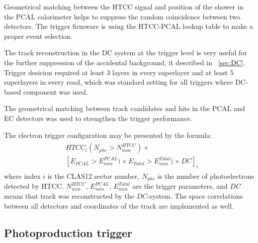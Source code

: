 Geometrical matching between the HTCC signal and position of the shower in the PCAL calorimeter helps to suppress the
random coincidence between two detectors. The trigger firmware is using the HTCC-PCAL lookup table to make a proper event selection.   

The track reconstruction in the DC system at the trigger level is very useful for the further suppression of the accidental background, it described in ~\ref{sec:DC}. Trigger desicion required at least 3 layers in every superlayer and at least 5 superlayers in every road, which was standard setting for all triggers where DC-based component was used.

The geometrical matching between track candidates and hits in the PCAL and EC detectors was used to strengthen the trigger performance.

The electron trigger configuration may be presented by the formula:
\begin{align} 
\label{eq:em_trg_formula}
\begin{split}
 &HTCC_i(N_{phe}{>}N^{HTCC}_{min})\times\\
 & [E_{PCAL}{>}E^{PCAL}_{min})\times E_{Total}{>}E^{Total}_{min})\times  DC]_i
 \end{split}
\end{align}
\noindent
where index $i$ is the CLAS12 sector number, $N_{phe}$ is the number of photoelectrons detected by HTCC.  $N^{HTCC}_{min}$, 
$E^{PCAL}_{min}$, $ E^{Total}_{min}$ are the trigger parameters, and $DC$ means that  track was reconstructed by the $DC$-system. The space correlations between all detectors and coordinates of the track are implemented as well.


\subsection{Photoproduction trigger}
\label{sec:photoproduction_trigger}

